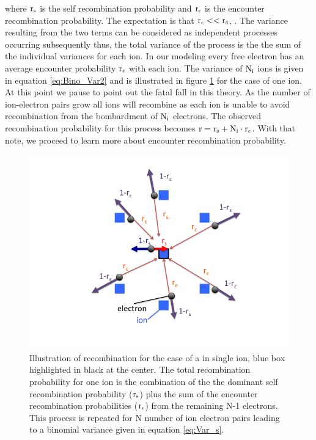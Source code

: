 \noindent where $\rm r_s$ is the self recombination probability and $\rm r_\epsilon$ is the encounter recombination probability. The expectation is that  $\rm r_\epsilon << r_s$, \cite{Mozumder}. The variance resulting from the two terms can be considered as independent processes occurring subsequently thus, the total variance of the process is the the sum of the individual variances for each ion. In our modeling every free electron has an average encounter probability $\rm r_\epsilon$ with each ion. The variance of $\rm N_i$ ions is given in equation \ref{eq:Bino_Var2} and is illustrated in figure \ref{fig:Flucs_Fig} for the case of one ion. At this point we pause to point out the fatal fall in this theory. As the number of ion-electron pairs grow all ions will recombine as each ion is unable to avoid recombination from the bombardment of $\rm N_i$ electrons. The observed recombination probability for this process becomes $\rm r=r_s + N_i\cdot r_\epsilon$. With that note, we proceed to learn more about encounter recombination probability. 

\renewcommand{\baselinestretch}{1}
\small\normalsize
\begin{figure}[h!]\centering
\includegraphics[width=150mm]{Chapter_Flucs/Figures/Recomb_Flucs/Bino_Var_ER.png}
\caption{Illustration of recombination for the case of a in single ion, blue box highlighted in black at the center. The total recombination probability for one ion is the combination of the the dominant self recombination probability ($\rm r_s$) plus the sum of the encounter recombination probabilities ($\rm r_\epsilon$) from the remaining N-1 electrons. This process is repeated for N number of ion electron pairs leading to a binomial variance given in equation \ref{eq:Var_s}. }
\label{fig:Flucs_Fig}
\end{figure}
\renewcommand{\baselinestretch}{2}
\small\normalsize


